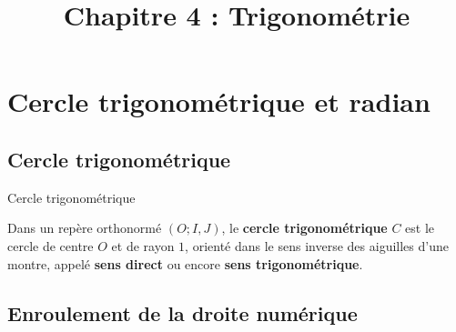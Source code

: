 \documentclass[11pt]{article}
\title{Chapitre 4 : Trigonométrie}
\date{}
\author{}
\begin{document}
\maketitle\thispagestyle{fancy}

\section{Cercle trigonométrique et radian}
\subsection{Cercle trigonométrique}

\begin{defi}{Cercle trigonométrique}
  \begin{minipage}{.5\textwidth}
    Dans un repère orthonormé $(O; I, J)$, le \textbf{cercle trigonométrique}
    $C$ est le cercle de centre $O$ et de rayon $1$, orienté dans le sens
    inverse des aiguilles d'une montre, appelé \textbf{sens direct} ou encore
    \textbf{sens trigonométrique}.
  \end{minipage}
  \begin{minipage}{.5\textwidth}
    \begin{center}
    \end{center}
  \end{minipage}
\end{defi}

\subsection{Enroulement de la droite numérique}
\end{document}
